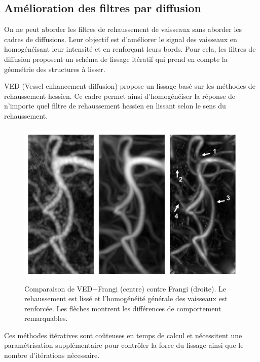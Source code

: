 \subsection{Amélioration des filtres par diffusion}
\label{sec:EA:rehaussement:diffusion}
On ne peut aborder les filtres de rehaussement de vaisseaux sans aborder les cadres de diffusions. Leur objectif est d'améliorer le signal des vaisseaux en homogénéisant leur intensité et en renforçant leurs bords. Pour cela, les filtres de diffusion proposent un schéma de lissage itératif qui prend en compte la géométrie des structures à lisser.


VED \cite{Manniesing2006_VED} (Vessel enhancement diffusion) propose un lissage basé sur les méthodes de rehaussement hessien. Ce cadre permet ainsi d'homogénéiser la réponse de n'importe quel filtre de rehaussement hessien en lissant selon le sens du rehaussement.
\begin{figure}[ht]
  \centering
  \includegraphics[height=8cm]{Images/VED.png}
  \caption{Comparaison de VED+Frangi (centre) contre Frangi (droite). Le rehaussement est lissé et l'homogénéité générale des vaisseaux est renforcée. Les flèches montrent les différences de comportement remarquables.}
  \label{fig:custom_fig}
\end{figure}
Ces méthodes itératives sont coûteuses en temps de calcul et nécessitent une paramétrisation supplémentaire pour contrôler la force du lissage ainsi que le nombre d'itérations nécessaire.
